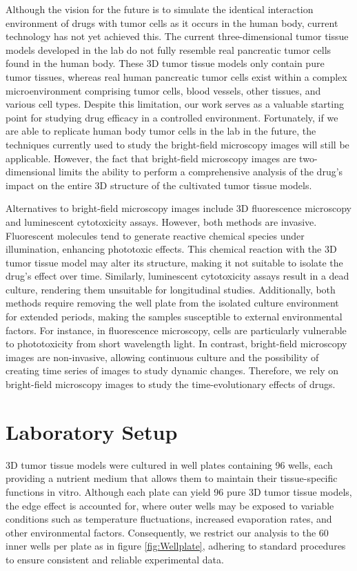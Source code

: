 Although the vision for the future is to simulate the identical interaction environment of drugs with tumor cells as it occurs in the human body, current technology has not yet achieved this. The current three-dimensional tumor tissue models developed in the lab do not fully resemble real pancreatic tumor cells found in the human body. These 3D tumor tissue models only contain pure tumor tissues, whereas real human pancreatic tumor cells exist within a complex microenvironment comprising tumor cells, blood vessels, other tissues, and various cell types. Despite this limitation, our work serves as a valuable starting point for studying drug efficacy in a controlled environment. Fortunately, if we are able to replicate human body tumor cells in the lab in the future, the techniques currently used to study the bright-field microscopy images will still be applicable. However, the fact that bright-field microscopy images are two-dimensional limits the ability to perform a comprehensive analysis of the drug's impact on the entire 3D structure of the cultivated tumor tissue models.

Alternatives to bright-field microscopy images include 3D fluorescence microscopy and luminescent cytotoxicity assays. However, both methods are invasive. Fluorescent molecules tend to generate reactive chemical species under illumination, enhancing phototoxic effects. This chemical reaction with the 3D tumor tissue model may alter its structure, making it not suitable to isolate the drug's effect over time. Similarly, luminescent cytotoxicity assays result in a dead culture, rendering them unsuitable for longitudinal studies. Additionally, both methods require removing the well plate from the isolated culture environment for extended periods, making the samples susceptible to external environmental factors. For instance, in fluorescence microscopy, cells are particularly vulnerable to phototoxicity from short wavelength light. In contrast, bright-field microscopy images are non-invasive, allowing continuous culture and the possibility of creating time series of images to study dynamic changes. Therefore, we rely on bright-field microscopy images to study the time-evolutionary effects of drugs.

\section{Laboratory Setup}
\label{sec:lab-setup}
3D tumor tissue models were cultured in well plates containing 96 wells, each providing a nutrient medium that allows them to maintain their tissue-specific functions in vitro. Although each plate can yield 96 pure 3D tumor tissue models, the edge effect is accounted for, where outer wells may be exposed to variable conditions such as temperature fluctuations, increased evaporation rates, and other environmental factors. Consequently, we restrict our analysis to the 60 inner wells per plate as in figure \ref{fig:Wellplate}, adhering to standard procedures to ensure consistent and reliable experimental data. 

